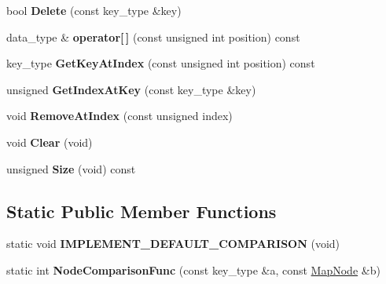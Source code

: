 \begin{DoxyCompactItemize}
\item 
\hypertarget{class_data_structures_1_1_map_af7be78b0821c0a775b3f0acfd7560abe}{bool {\bfseries Delete} (const key\-\_\-type \&key)}\label{class_data_structures_1_1_map_af7be78b0821c0a775b3f0acfd7560abe}

\item 
\hypertarget{class_data_structures_1_1_map_a18776c79d20486b7bd48e2e90b9c8005}{data\-\_\-type \& {\bfseries operator\mbox{[}$\,$\mbox{]}} (const unsigned int position) const }\label{class_data_structures_1_1_map_a18776c79d20486b7bd48e2e90b9c8005}

\item 
\hypertarget{class_data_structures_1_1_map_a9472d4b96dd3a7919819120c6a1c1466}{key\-\_\-type {\bfseries Get\-Key\-At\-Index} (const unsigned int position) const }\label{class_data_structures_1_1_map_a9472d4b96dd3a7919819120c6a1c1466}

\item 
\hypertarget{class_data_structures_1_1_map_aacb6191d7d678267acc8bf6286033b21}{unsigned {\bfseries Get\-Index\-At\-Key} (const key\-\_\-type \&key)}\label{class_data_structures_1_1_map_aacb6191d7d678267acc8bf6286033b21}

\item 
\hypertarget{class_data_structures_1_1_map_ab746756b18b120eed088420d9e289c0e}{void {\bfseries Remove\-At\-Index} (const unsigned index)}\label{class_data_structures_1_1_map_ab746756b18b120eed088420d9e289c0e}

\item 
\hypertarget{class_data_structures_1_1_map_a2d01e7c2be0ebd431ada0da5f3ebe98f}{void {\bfseries Clear} (void)}\label{class_data_structures_1_1_map_a2d01e7c2be0ebd431ada0da5f3ebe98f}

\item 
\hypertarget{class_data_structures_1_1_map_ad33475fbf642a7df45a48d9f453c3566}{unsigned {\bfseries Size} (void) const }\label{class_data_structures_1_1_map_ad33475fbf642a7df45a48d9f453c3566}

\end{DoxyCompactItemize}
\subsection*{Static Public Member Functions}
\begin{DoxyCompactItemize}
\item 
\hypertarget{class_data_structures_1_1_map_a5ff3a8c0572c98d5c2efa3e1380c77d5}{static void {\bfseries I\-M\-P\-L\-E\-M\-E\-N\-T\-\_\-\-D\-E\-F\-A\-U\-L\-T\-\_\-\-C\-O\-M\-P\-A\-R\-I\-S\-O\-N} (void)}\label{class_data_structures_1_1_map_a5ff3a8c0572c98d5c2efa3e1380c77d5}

\item 
\hypertarget{class_data_structures_1_1_map_a4737e24f5ae78118399dbeb80d2bd8a7}{static int {\bfseries Node\-Comparison\-Func} (const key\-\_\-type \&a, const \hyperlink{struct_data_structures_1_1_map_1_1_map_node}{Map\-Node} \&b)}\label{class_data_structures_1_1_map_a4737e24f5ae78118399dbeb80d2bd8a7}

\end{DoxyCompactItemize}
